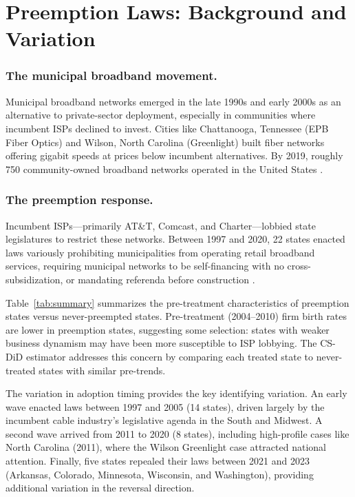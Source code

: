 \documentclass[12pt]{article}
\begin{document}

\section{Preemption Laws: Background and Variation}\label{sec:policy}

\subsubsection*{The municipal broadband movement.} Municipal broadband networks emerged in the late 1990s and early 2000s as an alternative to private-sector deployment, especially in communities where incumbent ISPs declined to invest. Cities like Chattanooga, Tennessee (EPB Fiber Optics) and Wilson, North Carolina (Greenlight) built fiber networks offering gigabit speeds at prices below incumbent alternatives. By 2019, roughly 750 community-owned broadband networks operated in the United States \citep{munibroadband2019}.

\subsubsection*{The preemption response.} Incumbent ISPs---primarily AT\&T, Comcast, and Charter---lobbied state legislatures to restrict these networks. Between 1997 and 2020, 22 states enacted laws variously prohibiting municipalities from operating retail broadband services, requiring municipal networks to be self-financing with no cross-subsidization, or mandating referenda before construction \citep{broadbandnow2020}.

Table~\ref{tab:summary} summarizes the pre-treatment characteristics of preemption states versus never-preempted states. Pre-treatment (2004--2010) firm birth rates are lower in preemption states, suggesting some selection: states with weaker business dynamism may have been more susceptible to ISP lobbying. The CS-DiD estimator addresses this concern by comparing each treated state to never-treated states with similar pre-trends.



The variation in adoption timing provides the key identifying variation. An early wave enacted laws between 1997 and 2005 (14 states), driven largely by the incumbent cable industry's legislative agenda in the South and Midwest. A second wave arrived from 2011 to 2020 (8 states), including high-profile cases like North Carolina (2011), where the Wilson Greenlight case attracted national attention. Finally, five states repealed their laws between 2021 and 2023 (Arkansas, Colorado, Minnesota, Wisconsin, and Washington), providing additional variation in the reversal direction.
\end{document}
